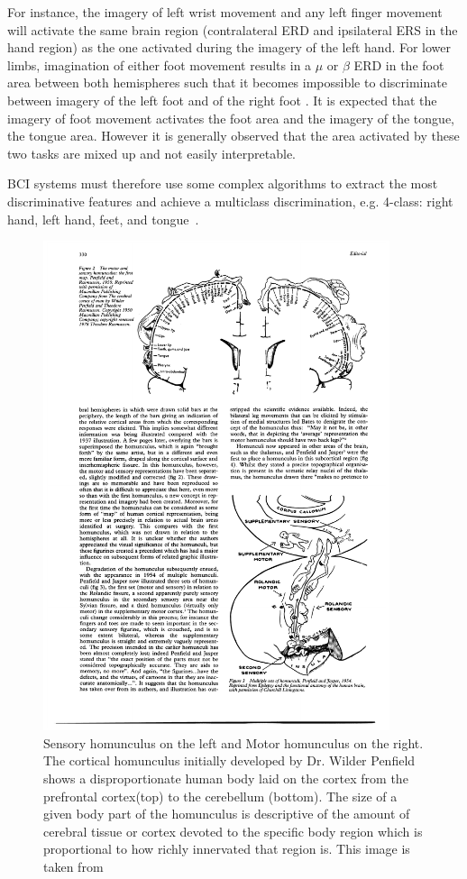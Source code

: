 For instance, the imagery of left wrist movement and any left finger movement will activate the same brain region (contralateral ERD and ipsilateral ERS in the hand region) as the one activated during the imagery of the left hand. 
For lower limbs, imagination of either foot movement results in a $\mu$ or $\beta$ ERD in the foot area between both hemispheres such that it becomes impossible to discriminate between imagery of the left foot and of the right foot \citep{pfurtscheller_event-related_1999}. It is expected that the imagery of foot movement activates the foot area and the imagery of the tongue, the tongue area. 
However it is generally observed that the area activated by these two tasks are mixed up and not easily interpretable. 

BCI systems must therefore use some complex algorithms to extract the most discriminative features and achieve a multiclass discrimination, e.g. 4-class: right hand, left hand, feet, and tongue~\citep{dornhege_boosting_2004, brunner_spatial_2007}.

\begin{figure}[!ht]
    \centering
    \includegraphics[width=4.0in]{Figures/homunculus.pdf}
    \caption{Sensory homunculus on the left and Motor homunculus on the right.
    The cortical homunculus initially developed by Dr. Wilder Penfield
    shows a disproportionate human body laid on the cortex from the prefrontal
    cortex(top) to the cerebellum (bottom). The size of a given body part
    of the homunculus is descriptive of the amount of cerebral tissue or cortex
    devoted to the specific body region which is proportional to how richly
    innervated that region is.
    This image is taken from \citep{schoot_penfields_1993} }
    \label{fig:homunculus}
\end{figure}


